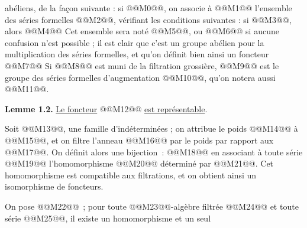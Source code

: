 
abéliens, de la
façon suivante : si @@M0@@, on associe à @@M1@@ l'ensemble des séries formelles @@M2@@, vérifiant les conditions suivantes : si @@M3@@, alors
@@M4@@
Cet ensemble sera noté @@M5@@, ou @@M6@@ si aucune confusion n'est possible ; il est clair que c'est un groupe abélien pour la multiplication des séries formelles, et qu'on définit bien ainsi un foncteur
@@M7@@
Si @@M8@@ est muni de la filtration grossière, @@M9@@ est le groupe des séries formelles d'augmentation @@M10@@, qu'on notera aussi @@M11@@.

\textbf{Lemme 1.2.} \uline{Le foncteur} @@M12@@ \uline{est représentable}.

Soit @@M13@@, une famille d'indéterminées ; on attribue le poids @@M14@@ à @@M15@@, et on filtre l'anneau @@M16@@ par le poids par rapport aux @@M17@@. On définit alors une bijection~:
@@M18@@
en associant à toute série @@M19@@ l'homomorphisme @@M20@@ déterminé par @@M21@@. Cet homomorphisme est compatible aux filtrations, et on obtient ainsi un isomorphisme de foncteurs.

On pose @@M22@@~; pour toute @@M23@@-algèbre filtrée @@M24@@ et toute série @@M25@@, il existe un homomorphisme et un
seul 
